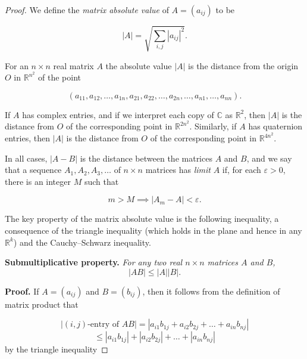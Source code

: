 \documentclass[11pt,a4paper]{article}
\theoremstyle{definition}
\numberwithin{equation}{section}
\begin{document}
\begin{proof}
    We define the \textit{matrix absolute value} of \( A = (a_{ij}) \) to be

\begin{equation*}
|A| = \sqrt{\sum_{i,j} |a_{ij}|^2}.
\end{equation*}

For an \( n \times n \) real matrix \( A \) the absolute value \( |A| \) is the distance from the origin \( O \) in \( \mathbb{R}^{n^2} \) of the point

\begin{equation*}
(a_{11}, a_{12}, \dots, a_{1n}, a_{21}, a_{22}, \dots, a_{2n}, \dots, a_{n1}, \dots, a_{nn}).
\end{equation*}

If \( A \) has complex entries, and if we interpret each copy of \( \mathbb{C} \) as \( \mathbb{R}^2 \), then \( |A| \) is the distance from \( O \) of the corresponding point in \( \mathbb{R}^{2n^2} \). Similarly, if \( A \) has quaternion entries, then \( |A| \) is the distance from \( O \) of the corresponding point in \( \mathbb{R}^{4n^2} \).

In all cases, \( |A - B| \) is the distance between the matrices \( A \) and \( B \), and we say that a sequence \( A_1, A_2, A_3, \dots \) of \( n \times n \) matrices has \textit{limit} \( A \) if, for each \( \varepsilon > 0 \), there is an integer \( M \) such that

\begin{equation*}
m > M \implies |A_m - A| < \varepsilon.
\end{equation*}

The key property of the matrix absolute value is the following inequality, a consequence of the triangle inequality (which holds in the plane and hence in any \( \mathbb{R}^k \)) and the Cauchy–Schwarz inequality.

\textbf{Submultiplicative property.} \textit{For any two real \( n \times n \) matrices \( A \) and \( B \),}
\begin{equation*}
|AB| \leq |A||B|.
\end{equation*}

\textbf{Proof.} If \( A = (a_{ij}) \) and \( B = (b_{ij}) \), then it follows from the definition of matrix product that

\begin{equation*}
|(i,j)\text{-entry of } AB| = |a_{i1} b_{1j} + a_{i2} b_{2j} + \dots + a_{in} b_{nj}|
\end{equation*}
\begin{equation*}
\leq |a_{i1} b_{1j}| + |a_{i2} b_{2j}| + \dots + |a_{in} b_{nj}|
\end{equation*}
by the triangle inequality


\end{proof}
\end{document}
